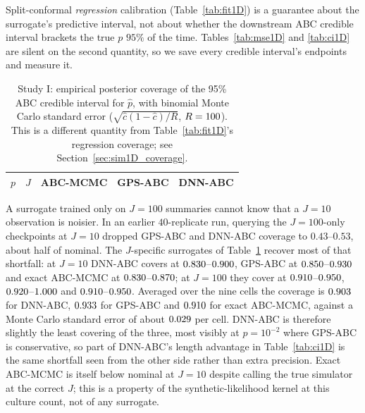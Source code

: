 \documentclass[sn-basic,iicol,pdflatex]{sn-jnl}
\begin{document}
Split-conformal \emph{regression} calibration (Table~\ref{tab:fit1D}) is a
guarantee about the surrogate's predictive interval, not about whether the
downstream ABC credible interval brackets the true $p$ $95\%$ of the time.
Tables~\ref{tab:mse1D} and \ref{tab:ci1D} are silent on the second quantity, so
we save every credible interval's endpoints and measure it.


\begin{table}[t]
\centering
\caption{Study I: empirical posterior coverage of the 95\% ABC credible
interval for $\hat p$, with binomial Monte Carlo standard error
($\sqrt{\hat c(1-\hat c)/R}$, $R=100$). This is a different quantity from
Table~\ref{tab:fit1D}'s regression coverage; see Section~\ref{sec:sim1D_coverage}.}
\label{tab:cov1D}
\begin{tabular}{rrrrr}
\toprule
$p$ & $J$ & ABC-MCMC & GPS-ABC & DNN-ABC \\
\midrule

\end{tabular}
\end{table}

A surrogate trained only on $J=100$ summaries cannot know that a $J=10$
observation is noisier. In an earlier $40$-replicate run, querying the $J{=}100$-only checkpoints at $J=10$ dropped
GPS-ABC and DNN-ABC coverage to $0.43$--$0.53$, about half of nominal. The
$J$-specific surrogates of Table~\ref{tab:cov1D} recover most of that
shortfall: at $J=10$ DNN-ABC covers at $0.830$--$0.900$, GPS-ABC at $0.850$--$0.930$ and exact ABC-MCMC at
$0.830$--$0.870$; at $J=100$ they cover at $0.910$--$0.950$, $0.920$--$1.000$ and
$0.910$--$0.950$. Averaged over the nine cells the coverage is $0.903$ for DNN-ABC, $0.933$ for GPS-ABC and $0.910$ for exact
ABC-MCMC, against a Monte Carlo standard error of about $0.029$ per cell. DNN-ABC is therefore slightly the least covering of the three, most visibly at $p=10^{-2}$ where GPS-ABC is conservative,
so part of DNN-ABC's length advantage in Table~\ref{tab:ci1D} is the same shortfall seen from the other side rather than extra precision. Exact ABC-MCMC is itself below nominal at $J=10$
despite calling the true simulator at the correct $J$; this is a property of the synthetic-likelihood kernel at this culture count, not of any surrogate.
\end{document}
